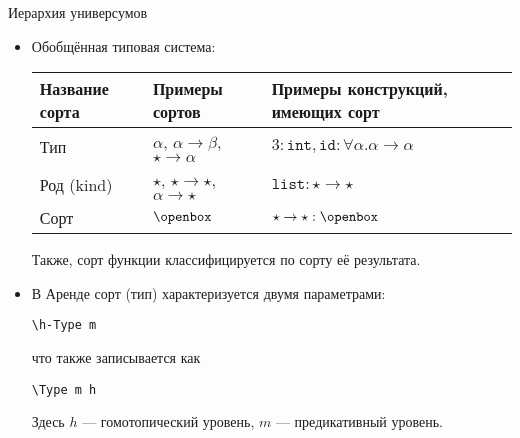 \documentclass[aspectratio=169,dvipsnames,usenames]{beamer}
\begin{document}
\begin{frame}[fragile]{Иерархия универсумов}
\begin{itemize}

\item Обобщённая типовая система:

\vspace{0.3cm}\begin{tabular}{lll}
Название сорта & Примеры сортов & Примеры конструкций, имеющих сорт\\\hline
Тип & $\alpha$, $\alpha\rightarrow\beta$, $\star\rightarrow\alpha$ & $3:\texttt{int}, \texttt{id}: \forall\alpha.\alpha\rightarrow\alpha$\\
Род (kind) & $\star$, $\star\rightarrow\star$, $\alpha\rightarrow\star$ & $\texttt{list}: \star\rightarrow\star$\\
Сорт & $\openbox$ & $\star\rightarrow\star : \openbox$
\end{tabular}

Также, сорт функции классифицируется по сорту её результата.

\item В Аренде сорт (тип) характеризуется двумя параметрами:

\begin{center}\verb!\h-Type m!\end{center}что также записывается как\begin{center}\verb!\Type m h!\end{center}

Здесь $h$ --- гомотопический уровень, $m$ --- предикативный уровень.
\end{itemize}

\end{frame}
\end{document}
